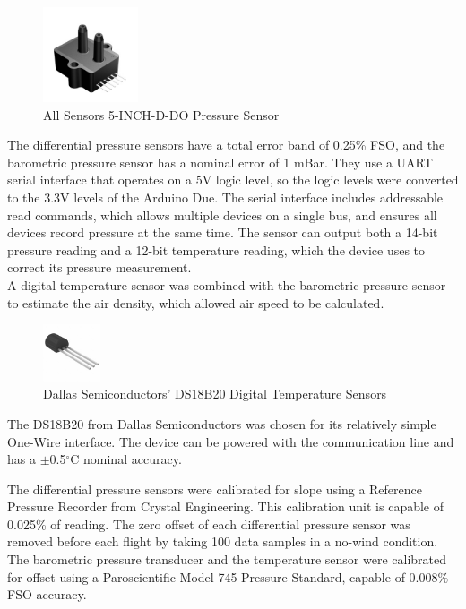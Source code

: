 \begin{figure}[H]

  \centering
    \includegraphics[width=0.25\textwidth]{figures/allsensorsPressure.jpg}
      \caption{All Sensors 5-INCH-D-DO Pressure Sensor} \label{allsensorsPressurePic}
\end{figure}

The differential pressure sensors have a total error band of 0.25\% FSO, and the barometric pressure sensor has a nominal error of 1 mBar. They use a UART serial interface that operates on a 5V logic level, so the logic levels were converted to the 3.3V levels of the Arduino Due. The serial interface includes addressable read commands, which allows multiple devices on a single bus, and ensures all devices record pressure at the same time. The sensor can output both a 14-bit pressure reading and a 12-bit temperature reading, which the device uses to correct its pressure measurement.\\

A digital temperature sensor was combined with the barometric pressure sensor to estimate the air density, which allowed air speed to be calculated.

\begin{figure}[H]

  \centering
    \includegraphics[width=0.15\textwidth]{figures/ds18b20Picture.jpg}
  \caption{Dallas Semiconductors' DS18B20 Digital Temperature Sensors} \label{ds18b20Picture}
\end{figure}
 The DS18B20 from Dallas Semiconductors was chosen for its relatively simple One-Wire interface. The device can be powered with the communication line and has a $\pm$0.5$^\circ$C nominal accuracy\cite{DS18B20Datasheet}.

The differential pressure sensors were calibrated for slope using a Reference Pressure Recorder from Crystal Engineering\cite{pressCalib}. This calibration unit is capable of 0.025\% of reading. The zero offset of each differential pressure sensor was removed before each flight by taking 100 data samples in a no-wind condition. The barometric pressure transducer and the temperature sensor were calibrated for offset using a Paroscientific Model 745 Pressure Standard, capable of $0.008\%$ FSO accuracy\cite{pressureStandard}. 

